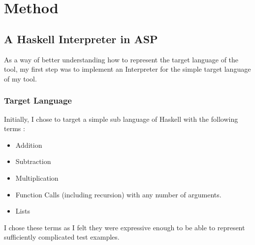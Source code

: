 \chapter{Method}

\section{A Haskell Interpreter in ASP}

As a way of better understanding how to represent the target language of the tool, my first step was to implement an Interpreter for the simple target language of my tool.

\subsection{Target Language}

Initially, I chose to target a simple sub language of Haskell with the following terms :

\begin{itemize}
\item Addition
\item Subtraction
\item Multiplication
\item Function Calls (including recursion) with any number of arguments.
\item Lists
\end{itemize}

I chose these terms as I felt they were expressive enough to be able to represent sufficiently complicated test examples.\\ \\



